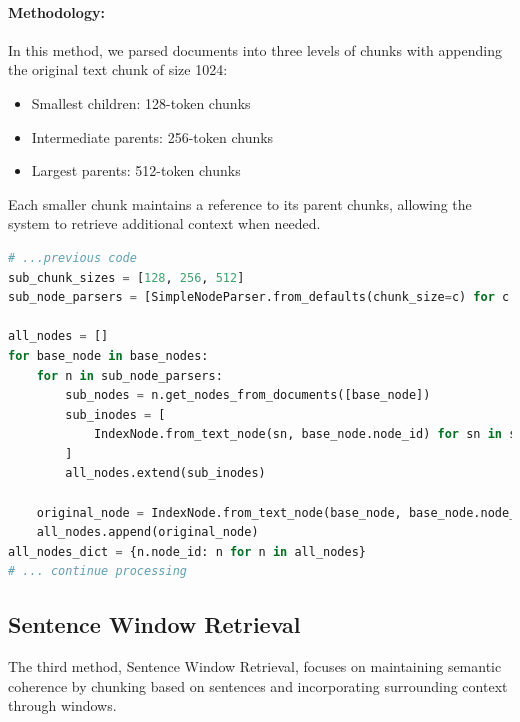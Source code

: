 \paragraph{Methodology:}
In this method, we parsed documents into three levels of chunks with appending the original text chunk of size 1024:
\begin{itemize}
    \item Smallest children: 128-token chunks
    \item Intermediate parents: 256-token chunks
    \item Largest parents: 512-token chunks
\end{itemize}
Each smaller chunk maintains a reference to its parent chunks, allowing the system to retrieve additional context when needed.

\begin{lstlisting}[language=Python, caption=Small2Big chunking method, label=lst:small2big_chunking]
# ...previous code
sub_chunk_sizes = [128, 256, 512]
sub_node_parsers = [SimpleNodeParser.from_defaults(chunk_size=c) for c in sub_chunk_sizes]

all_nodes = []
for base_node in base_nodes:
    for n in sub_node_parsers:
        sub_nodes = n.get_nodes_from_documents([base_node])
        sub_inodes = [
            IndexNode.from_text_node(sn, base_node.node_id) for sn in sub_nodes
        ]
        all_nodes.extend(sub_inodes)

    original_node = IndexNode.from_text_node(base_node, base_node.node_id) # also add original node to node
    all_nodes.append(original_node)
all_nodes_dict = {n.node_id: n for n in all_nodes}
# ... continue processing
\end{lstlisting}

\subsection{Sentence Window Retrieval}\label{subsec:sentence-window-retrieval}
The third method, Sentence Window Retrieval, focuses on maintaining semantic coherence by chunking based on sentences and incorporating surrounding context through windows.
